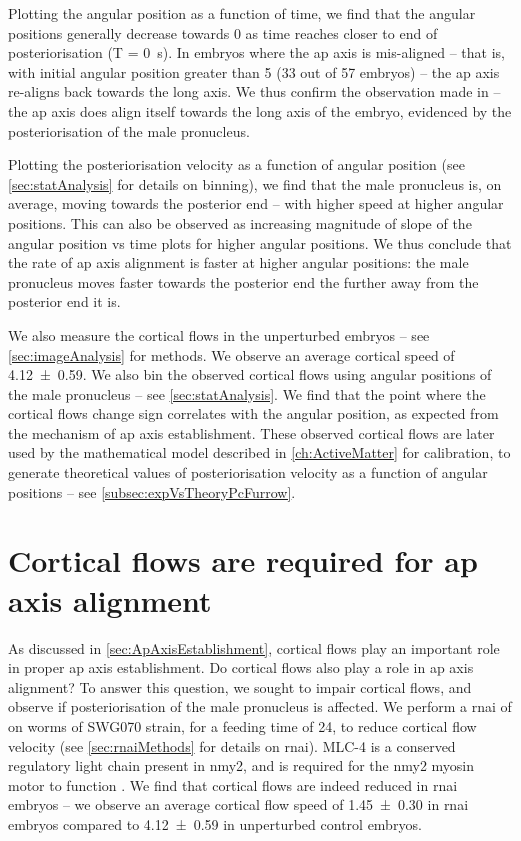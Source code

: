 Plotting the angular position as a function of time, we find that the angular positions generally decrease towards \SI{0}{\unitAngle} as time reaches closer to end of posteriorisation (T = \SI{0}{\second}). In embryos where the \ac{ap} axis is mis-aligned -- that is, with initial angular position greater than \SI{5}{\unitAngle} (\num{33} out of \num{57} embryos) -- the \ac{ap} axis re-aligns back towards the long axis. We thus confirm the observation made in \cite{goldstein1996specification} -- the \ac{ap} axis does align itself towards the long axis of the embryo, evidenced by the posteriorisation of the male pronucleus.

Plotting the posteriorisation velocity as a function of angular position (see \autoref{sec:statAnalysis} for details on binning), we find that the male pronucleus is, on average, moving towards the posterior end -- with higher speed at higher angular positions. This can also be observed as increasing magnitude of slope of the angular position vs time plots for higher angular positions. We thus conclude that the rate of \ac{ap} axis alignment is faster at higher angular positions: the male pronucleus moves faster towards the posterior end the further away from the posterior end it is.

We also measure the cortical flows in the unperturbed embryos -- see \autoref{sec:imageAnalysis} for methods. We observe an average cortical speed of \SI{4.12 +- 0.59}{\unitCrtxVel}. We also bin the observed cortical flows using angular positions of the male pronucleus -- see \autoref{sec:statAnalysis}. We find that the point where the cortical flows change sign correlates with the angular position, as expected from the mechanism of \ac{ap} axis establishment. These observed cortical flows are later used by the mathematical model described in \autoref{ch:ActiveMatter} for calibration, to generate theoretical values of posteriorisation velocity as a function of angular positions -- see \autoref{subsec:expVsTheoryPcFurrow}.

\section{Cortical flows are required for \ac{ap} axis alignment}\label{sec:corticalFlowsRoleMlc4}
As discussed in \autoref{sec:ApAxisEstablishment}, cortical flows play an important role in proper \ac{ap} axis establishment. Do cortical flows also play a role in \ac{ap} axis alignment? To answer this question, we sought to impair cortical flows, and observe if posteriorisation of the male pronucleus is affected. We perform a \ac{rnai} of  on worms of SWG070 strain, for a feeding time of \SI{24}{\unitRNAiTime}, to reduce cortical flow velocity (see \autoref{sec:rnaiMethods} for details on \ac{rnai}). MLC-4 is a conserved regulatory light chain present in \ac{nmy2}, and is required for the \ac{nmy2} myosin motor to function \citep{shelton1999nonmuscle}. We find that cortical flows are indeed reduced in  \ac{rnai} embryos -- we observe an average cortical flow speed of \SI{1.45 +- 0.30}{\unitCrtxVel} in  \ac{rnai} embryos compared to \SI{4.12 +- 0.59}{\unitCrtxVel} in unperturbed control embryos.


